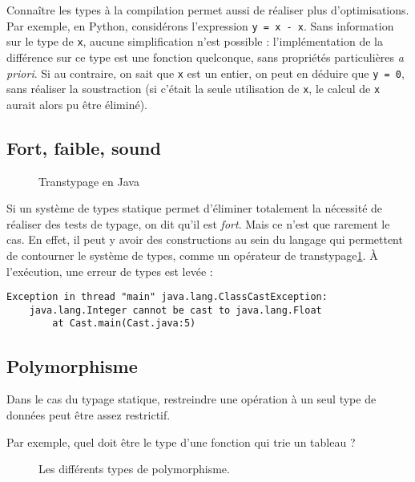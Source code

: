 Connaître les types à la compilation permet aussi de réaliser plus
d'optimisations. Par exemple, en Python, considérons l'expression \texttt{y = x
- x}. Sans information sur le type de \texttt{x}, aucune simplification n'est
possible : l'implémentation de la différence sur ce type est une fonction
quelconque, sans propriétés particulières \emph{a priori}. Si au contraire, on
sait que \texttt{x} est un entier, on peut en déduire que \texttt{y = 0}, sans
réaliser la soustraction (si c'était la seule utilisation de \texttt{x}, le
calcul de \texttt{x} aurait alors pu être éliminé).

\subsection{Fort, faible, sound}

\begin{figure}
  \caption{Transtypage en Java}
  \label{fig:javacast}
\end{figure}

Si un système de types statique permet d'éliminer totalement la nécessité de
réaliser des tests de typage, on dit qu'il est \emph{fort}. Mais ce n'est que
rarement le cas. En effet, il peut y avoir des constructions au sein du langage
qui permettent de contourner le système de types, comme un opérateur de
transtypage\ref{fig:javacast}. À l'exécution, une erreur de types est levée :

\begin{Verbatim}
Exception in thread "main" java.lang.ClassCastException:
    java.lang.Integer cannot be cast to java.lang.Float
        at Cast.main(Cast.java:5)
\end{Verbatim}

\clearpage

\subsection{Polymorphisme}

Dans le cas du typage statique, restreindre une opération à un seul type de
données peut être assez restrictif.

Par exemple, quel doit être le type d'une fonction qui trie un tableau ?

\begin{figure}
\centering

\caption{Les différents types de polymorphisme.}
\label{fig:types-de-polymorphisme}
\end{figure}

